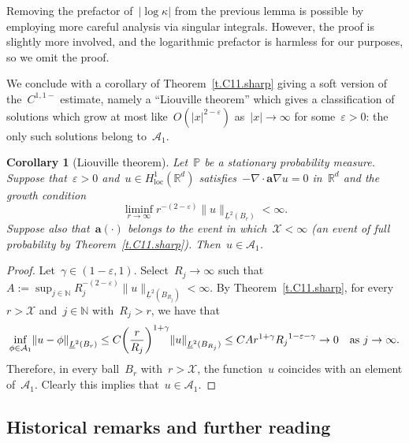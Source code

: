 \documentclass[11pt,twoside]{article} %
\numberwithin{equation}{section}
\newtheorem{corollary}[theorem]{Corollary}
\theoremstyle{definition}
\let\originalleft\left
\let\originalright\right
\renewcommand{\left}{\mathopen{}\mathclose\bgroup\originalleft}
\renewcommand{\right}{\aftergroup\egroup\originalright}
\newcommand*{\N}{\ensuremath{\mathbb{N}}}
\newcommand*{\Rd}{\ensuremath{\mathbb{R}^d}}
\newcommand{\eps}{\varepsilon}
\newcommand{\ep}{\eps}
\renewcommand{\a}{\mathbf{a}}
\renewcommand{\P}{\mathbb{P}}
\newcommand{\X}{\mathcal{X}}
\begin{document}
Removing the prefactor of~$|\log \kappa|$ from the previous lemma is possible by employing more careful analysis via singular integrals. However, the proof is slightly more involved, and the logarithmic prefactor is harmless for our purposes, so we omit the proof. 

\smallskip

We conclude with a corollary of Theorem~\ref{t.C11.sharp} giving a soft version of the~$C^{1,1-}$ estimate, namely a ``Liouville theorem'' which gives a classification of solutions which grow at most like~$O(|x|^{2-\ep})$ as~$|x|\to \infty$ for some~$\ep>0$: the only such solutions belong to~$\mathcal{A}_1$. 

\begin{corollary}[Liouville theorem] 
\label{cor.Liouville}
Let~$\P$ be a stationary probability measure. 
Suppose that~$\ep>0$ and~$u\in H^1_{\mathrm{loc}}(\Rd)$ satisfies~$-\nabla \cdot\a\nabla u = 0$ in~$\Rd$ and the growth condition
\begin{equation*}
\liminf_{r \to \infty} 
r^{-(2-\ep)} 
\| u \|_{\underline{L}^2(B_r)} 
< \infty. 
\end{equation*}
Suppose also that~$\a(\cdot)$ belongs to the event in which~$\X < \infty$ (an event of full probability by Theorem~\ref{t.C11.sharp}). 
Then~$u \in\mathcal{A}_1$.
\end{corollary}
\begin{proof}
Let~$\gamma \in ( 1-\ep, 1 )$. 
Select~$R_j \to \infty$ such that~$A:= \sup_{j\in\N} R_j^{-(2-\ep)} 
\| u \|_{\underline{L}^2(B_{R_j})} < \infty$. By Theorem~\ref{t.C11.sharp}, for every~$r> \X$ and~$j\in\N$ with~$R_j  > r$, we have that 
\begin{equation*}
\inf_{\phi\in \mathcal{A}_1} 
\left\| u - \phi \right\|_{\underline{L}^2(B_r)} 
\leq 
C \left( \frac r {R_j} \right)^{1+\gamma} 
\left\| u  \right\|_{\underline{L}^2(B_{R_j})}
\leq 
CA r^{1+\gamma} {R_j}^{1-\ep - \gamma}
\rightarrow 0 \quad \mbox{as} \ j\to \infty.
\end{equation*}
Therefore, in every ball~$B_r$ with~$r>\X$, the function~$u$ coincides with an element of~$\mathcal{A}_1$. Clearly this implies that~$u\in \mathcal{A}_1$. 
\end{proof}



\subsection*{Historical remarks and further reading}
\end{document}
